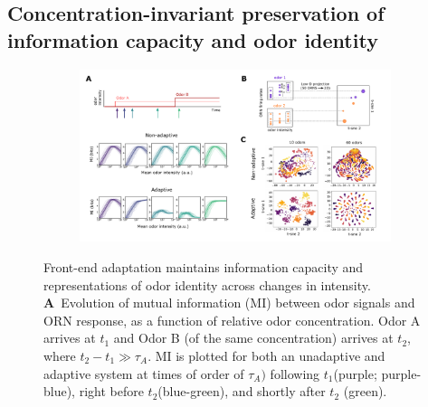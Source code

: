 
\subsection{Concentration-invariant preservation of information capacity and odor identity}



\begin{figure}[!tb]
	\centering
	\begin{subfigure}[t]{\linewidth}
		\includegraphics[width=\textwidth]{figures/2_coding_representation}
		\label{fig:coding_a}
	\end{subfigure}
	\begin{subfigure}[t]{0\linewidth}
		\label{fig:coding_b}
	\end{subfigure}
	\caption{\footnotesize{Front-end adaptation maintains information capacity and representations of odor identity across changes in intensity. 
    	\textbf{A}~Evolution of mutual information (MI) between odor signals and ORN response, as a function of relative odor concentration. Odor A arrives  at $t_1$ and Odor B (of the same concentration) arrives at $t_2$, where $t_2 - t_1 \gg \tau_A$. MI is plotted for both an unadaptive and adaptive system at times of order of $\tau_A)$ following $t_1$(purple; purple-blue), right before $t_2$(blue-green), and shortly after $t_2$ (green). 
}}
\end{figure}
